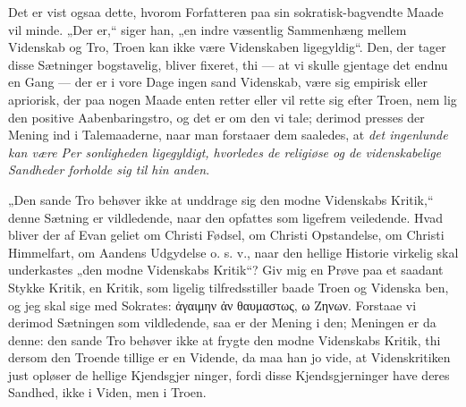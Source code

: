 \documentclass[12pt]{book}
\newcommand{\opage}[1]{\marginnote{\footnotesize\textit{[#1]}}}
\begin{document}
Det er vist ogsaa dette, hvorom Forfatteren paa sin
sokratisk-bagvendte Maade vil minde. „Der er,“ siger han,
„en indre væsentlig Sammenhæng mellem Videnskab og Tro,
Troen kan ikke være Videnskaben ligegyldig“. Den, der tager
disse Sætninger bogstavelig, bliver fixeret, thi --- at vi skulle
gjentage det endnu en Gang --- der er i vore Dage ingen
sand Videnskab, være sig empirisk eller apriorisk, der paa
nogen Maade enten retter eller vil rette sig efter Troen, nem\-%
lig den positive Aabenbaringstro, og det er om den vi tale;
derimod presses der Mening ind i Talemaaderne, naar man
forstaaer dem saaledes, at \emph{det ingenlunde kan være Per\-%
sonligheden ligegyldigt, hvorledes de religiøse og
de videnskabelige Sandheder forholde sig til hin\-%
anden}.

„Den sande Tro behøver ikke at unddrage sig den modne
Videnskabs Kritik,“ denne Sætning er vildledende, naar den
opfattes som ligefrem veiledende. Hvad bliver der af Evan\-%
geliet om Christi Fødsel, om Christi Opstandelse, om Christi
Himmelfart, om Aandens Udgydelse o. s. v., naar den hellige
Historie virkelig skal underkastes „den modne Videnskabs
Kritik“? Giv mig en Prøve paa et saadant Stykke Kritik,
en Kritik, som ligelig tilfredsstiller baade Troen og Videnska\-%
ben, og jeg skal sige med Sokrates: ἀγαιμην ἀν θαυμαστως,
ω Ζηνων. Forstaae vi derimod Sætningen som vildledende,
\opage{321}\setcounter{footnote}{0}%
saa er der Mening i den; Meningen er da denne: den sande
Tro behøver ikke at frygte den modne Videnskabs Kritik,
thi dersom den Troende tillige er en Vidende, da maa han
jo vide, at Videnskritiken just opløser de hellige Kjendsgjer\-%
ninger, fordi disse Kjendsgjerninger have deres Sandhed, ikke
i Viden, men i Troen.
\end{document}
